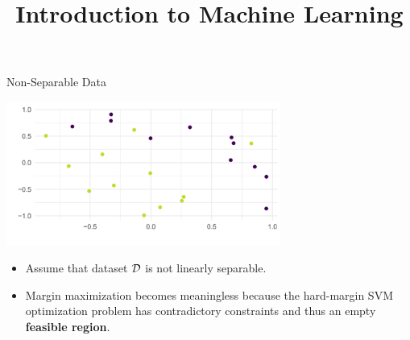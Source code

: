 




\newcommand{\titlefigure}{figure_man/support-vec.png}
\newcommand{\learninggoals}{
  \item Understand that the hard-margin SVM problem is not solvable for linearly separable data
  \item Know that the soft-margin SVM problem therefore allows margin violations 
  \item The degree to which margin violations are tolerated is controlled by a hyperparameter 
}

\title{Introduction to Machine Learning}
\date{}




\sloppy 

\begin{vbframe}{Non-Separable Data}

\vspace{0.1cm}
\begin{center}
\includegraphics[width = 9cm ]{figure_man/non-separable-data.png} \\
\end{center}


\begin{itemize}
    \item Assume that dataset $\mathcal{D}$ is not linearly separable.
    \item Margin maximization becomes meaningless because the
    hard-margin SVM optimization problem has contradictory
    constraints and thus an empty \textbf{feasible region}.
\end{itemize}
\end{vbframe}

